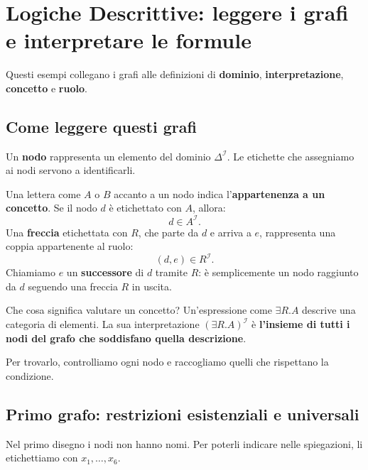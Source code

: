 \newpage

\section{Logiche Descrittive: leggere i grafi e interpretare le formule}

Questi esempi collegano i grafi alle definizioni di \textbf{dominio},
\textbf{interpretazione}, \textbf{concetto} e \textbf{ruolo}.

\subsection{Come leggere questi grafi}

Un \textbf{nodo} rappresenta un elemento del dominio \(\Delta^{\mathcal I}\).
Le etichette che assegniamo ai nodi servono a identificarli.

Una lettera come \(A\) o \(B\) accanto a un nodo indica
l'\textbf{appartenenza a un concetto}. Se il nodo \(d\) è etichettato con \(A\), allora:
\[
    d\in A^{\mathcal I}.
\]
Una \textbf{freccia} etichettata con \(R\), che parte da \(d\) e arriva a \(e\),
rappresenta una coppia appartenente al ruolo:
\[
    (d,e)\in R^{\mathcal I}.
\]
Chiamiamo \(e\) un \textbf{successore} di \(d\) tramite \(R\): è semplicemente
un nodo raggiunto da \(d\) seguendo una freccia \(R\) in uscita.

\begin{observation}{Che cosa significa valutare un concetto?}
    Un'espressione come \(\exists R.A\) descrive una categoria di elementi.
    La sua interpretazione \((\exists R.A)^{\mathcal I}\) è \textbf{l'insieme
    di tutti i nodi del grafo che soddisfano quella descrizione}.

    Per trovarlo, controlliamo ogni nodo e raccogliamo quelli che rispettano
    la condizione.
\end{observation}

\subsection{Primo grafo: restrizioni esistenziali e universali}

Nel primo disegno i nodi non hanno nomi. Per poterli indicare nelle
spiegazioni, li etichettiamo con \(x_1,\ldots,x_6\).

